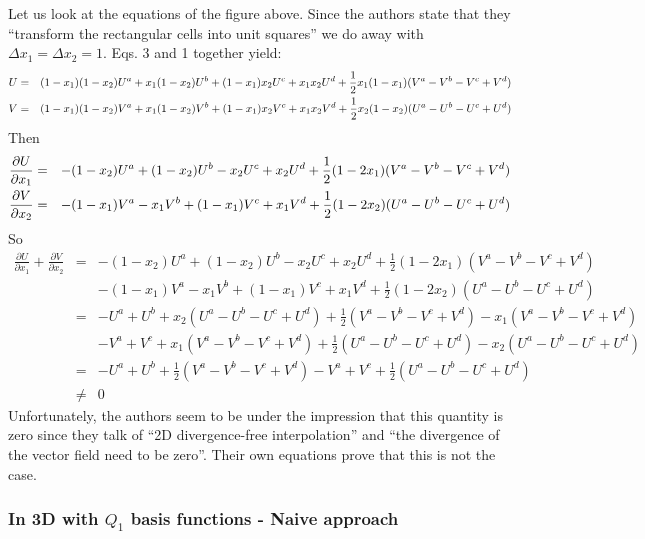 Let us look at the equations of the figure above. 
Since the authors state that they ``transform the rectangular cells into unit squares'' 
we do away with $\Delta x_1 = \Delta x_2 = 1$. Eqs. 3 and 1 together yield:
\begin{eqnarray}
U&=&(1-x_1)(1-x_2) U^a+x_1(1-x_2)U^b + (1-x_1)x_2 U^c + x_1x_2 U^d
+ \frac12 x_1(1-x_1)(V^a-V^b-V^c+V^d) \nonumber\\
V&=&(1-x_1)(1-x_2) V^a+x_1(1-x_2)V^b + (1-x_1)x_2 V^c + x_1x_2 V^d
+ \frac12 x_2(1-x_2)(U^a-U^b-U^c+U^d) \nonumber
\end{eqnarray}
Then 
\begin{eqnarray}
\frac{\partial U}{\partial x_1} 
&=& -(1-x_2) U^a+(1-x_2)U^b -x_2 U^c + x_2 U^d + \frac12 (1-2x_1)(V^a-V^b-V^c+V^d) \nonumber\\
\frac{\partial V}{\partial x_2}
&=& -(1-x_1) V^a - x_1V^b + (1-x_1) V^c + x_1 V^d + \frac12 (1-2x_2)(U^a-U^b-U^c+U^d) \nonumber
\end{eqnarray}
So 
\begin{eqnarray}
\frac{\partial U}{\partial x_1} \! + \! \frac{\partial V}{\partial x_2} 
&=&
-(1-x_2) U^a+(1-x_2)U^b -x_2 U^c + x_2 U^d + \frac12 (1-2x_1)(V^a-V^b-V^c+V^d) \nonumber\\
&&-(1-x_1) V^a - x_1V^b + (1-x_1) V^c + x_1 V^d + \frac12 (1-2x_2)(U^a-U^b-U^c+U^d) \nonumber\\
&=& -U^a + U^b + x_2(U^a-U^b-U^c+U^d) + \frac12 (V^a-V^b-V^c+V^d)
-x_1 (V^a-V^b-V^c+V^d) \nonumber\\
&& -V^a+V^c + x_1(V^a-V^b-V^c+V^d) + \frac12 (U^a-U^b-U^c+U^d)
-x_2 (U^a-U^b-U^c+U^d) \nonumber\\
&=& -U^a + U^b  + \frac12 (V^a-V^b-V^c+V^d)
 -V^a+V^c  + \frac12 (U^a-U^b-U^c+U^d) \nonumber\\
 &\neq & 0
\end{eqnarray}
Unfortunately, the authors seem to be under the impression that 
this quantity is zero since they talk of ``2D divergence-free interpolation'' 
and ``the divergence of the vector field need to be
zero''. Their own equations prove that this is not the case.


\subsubsection{In 3D with $Q_1$ basis functions - Naive approach}

